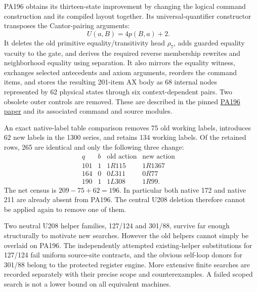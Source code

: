 PA196 obtains its thirteen-state improvement by changing the logical command
construction and its compiled layout together.  Its universal-quantifier
constructor transposes the Cantor-pairing arguments:
\[
                    U(a,B)=4p(B,a)+2.
\]
It deletes the old primitive equality/transitivity head $\rho_7$, adds guarded
equality vacuity to the gate, and derives the required reverse membership
rewrites and neighborhood equality using separation.  It also mirrors the
equality witness, exchanges selected antecedents and axiom arguments,
reorders the command items, and stores the resulting 201-item AX body as
68 internal nodes represented by 62 physical states through six
context-dependent pairs.  Two obsolete outer controls are removed.
These are described in the pinned
\href{https://github.com/jamesyc/BusyBeaver/blob/407cdc356f6b586635e71ac92be394255f4bfea4/paper/pa196.tex}{PA196 paper}
and its associated command and source modules.

An exact native-label table comparison removes 75 old working labels,
introduces 62 new labels in the 1300 series, and retains 134 working labels.
Of the retained rows, 265 are identical and only the following three change:
\[
\begin{array}{cc|l|l}
q&b&\text{old action}&\text{new action}\\\hline
101&1&1R115&1R1367\\
164&0&0L311&0R77\\
190&1&1L308&1R99.
\end{array}
\]
The net census is $209-75+62=196$.  In particular both native 172 and native
211 are already absent from PA196.  The central U208 deletion therefore
cannot be applied again to remove one of them.

Two neutral U208 helper families, 127/124 and 301/88, survive far enough
structurally to motivate new searches.  However the old helpers cannot simply
be overlaid on PA196.  The independently attempted existing-helper
substitutions for 127/124 fail uniform source-site contracts, and the
obvious self-loop donors for 301/88 belong to the protected register engine.
More extensive finite searches are recorded separately with their precise
scope and counterexamples.  A failed scoped search is not a lower bound on
all equivalent machines.

